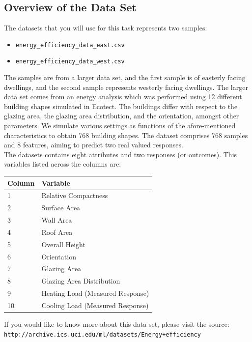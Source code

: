 \documentclass[12pt]{article}
\begin{document}
\subsection*{Overview of the Data Set}
The datasets that you will use for this task represents two samples:
\begin{itemize}
\item \verb|energy_efficiency_data_east.csv|
\item \verb|energy_efficiency_data_west.csv|
\end{itemize}
The samples are from a larger data set, and the first sample is of easterly facing dwellings, and the second sample represents westerly facing dwellings. The larger data set comes from an energy analysis which was performed using 12 different building shapes simulated in Ecotect. The buildings differ with respect to the glazing area, the glazing area distribution, and the orientation, amongst other parameters. We simulate various settings as functions of the afore-mentioned characteristics to obtain 768 building shapes. The dataset comprises 768 samples and 8 features, aiming to predict two real valued responses.\\

The datasets contains eight attributes and two responses (or outcomes). This variables listed across the columns are:
\begin{table}[h]
\begin{tabular}{p{2cm} p{12cm}}
\toprule
\textbf{Column} & \textbf{Variable} \\
\midrule
1 & Relative Compactness\\
2 & Surface Area\\
3 & Wall Area\\
4 & Roof Area\\
5 & Overall Height\\
6 & Orientation\\
7 & Glazing Area\\ 
8 & Glazing Area Distribution\\
9 & Heating Load (Measured Response)\\
10 & Cooling Load (Measured Response)\\
\bottomrule
\end{tabular}
\end{table}

If you would like to know more about this data set, please visit the source:\\

\verb|http://archive.ics.uci.edu/ml/datasets/Energy+efficiency|\\
\end{document}
